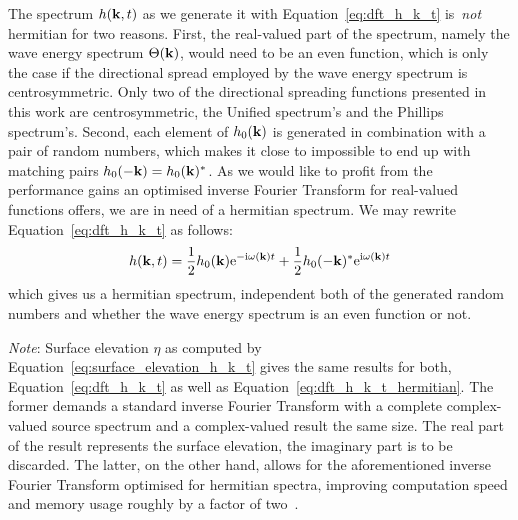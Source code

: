 The spectrum $h(\mathbf{k},t)$ as we generate it with Equation~\ref{eq:dft_h_k_t} is~\emph{not}
hermitian for two reasons. First, the real-valued part of the spectrum, namely
the wave energy spectrum $\Theta(\mathbf{k})$, would need to be an even function,
which is only the case if the directional spread employed by
the wave energy spectrum is centrosymmetric. Only two of the directional spreading functions
presented in this work are centrosymmetric, the Unified spectrum's and the Phillips spectrum's.
Second, each element of $h_0(\mathbf{k})$ is generated in combination with a pair of random numbers,
which makes it close to impossible to end up with matching pairs $h_0(-\mathbf{k})=h_0(\mathbf{k})^*$.
As we would like to profit from the performance gains an optimised inverse Fourier Transform
for real-valued functions offers, we are in need of a hermitian spectrum. We may rewrite
Equation~\ref{eq:dft_h_k_t} as follows:
%
\begin{equation}
\label{eq:dft_h_k_t_hermitian}
 h(\mathbf{k}, t) =
 \frac{1}{2} h_0(\mathbf{k})\mathrm{e}^{-\mathrm{i}\omega(\mathbf{k})t}
 + \frac{1}{2} h_0(\mathbf{-k})^*\mathrm{e}^{\mathrm{i}\omega(\mathbf{k})t}
\end{equation}
%
which gives us a hermitian spectrum, independent both of the generated random numbers and 
whether the wave energy spectrum is an even function or not.

\emph{Note}: Surface elevation $\eta$ as computed by Equation~\ref{eq:surface_elevation_h_k_t}
gives the same results for both,
Equation~\ref{eq:dft_h_k_t} as well as Equation~\ref{eq:dft_h_k_t_hermitian}.
The former demands a standard inverse
Fourier Transform with a complete complex-valued source spectrum and a
complex-valued result the same size. The real part of the result represents
the surface elevation, the imaginary part is to be discarded. The latter,
on the other hand, allows for the aforementioned inverse Fourier Transform
optimised for hermitian spectra, improving computation speed and memory usage
roughly by a factor of two~\citep{fftw:manual}.
%
